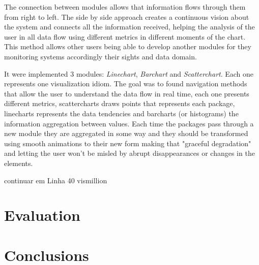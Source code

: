 \documentclass[letterpaper, 10 pt, conference]{ieeeconf}  %
\begin{document}
The connection between modules allows that information flows through them from right to left. The side by side approach creates a continuous vision about the system and connects all the information received, helping the analysis of the user in all data flow using different metrics in different moments of the chart. This method allows other users being able to develop another modules for they monitoring systems accordingly their sights and data domain.

It were implemented 3 modules: \textit{Linechart}, \textit{Barchart} and \textit{Scatterchart}. Each one represents one visualization idiom. The goal was to found navigation methods that allow the user to understand the data flow in real time, each one presents different metrics, scattercharts draws points that represents each package, linecharts represents the data tendencies and barcharts (or histograms) the information aggregation between values.
Each time the packages pass through a new module they are aggregated in some way and they should be transformed using smooth animations to their new form making that "graceful degradation" and letting the user won't be misled by abrupt disappearances or changes in the elements. 

continuar em 
Linha 40 vismillion

\section{Evaluation}
\label{section:evaluation}

\section{Conclusions}
\label{section:conclusions}



\addtolength{\textheight}{-12cm}   %















\end{document}
